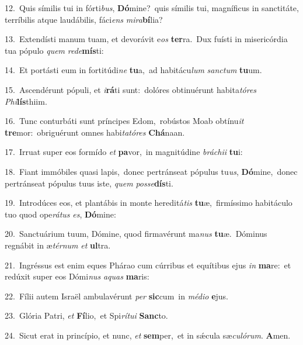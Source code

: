 {\numbfont\textcolor{\numbcolor}{12.}}~Quis símilis tui in fórti\-\textit{bus}\-, \textbf{Dó}\-mine?~\star quis símilis tui, magníficus in sanctitáte, terríbilis atque laudábilis, fáci\textit{ens} \textit{mi}\-\textit{ra}\textbf{bí}lia?\par
{\numbfont\textcolor{\numbcolor}{13.}}~Extendísti manum tuam, et devorávit e\textit{os} \textbf{ter}\-ra.~\star Dux fuísti in misericórdia tua pópulo \textit{quem} \textit{red}\-\textit{e}\textbf{mís}ti:\par
{\numbfont\textcolor{\numbcolor}{14.}}~Et portásti eum in fortitúdi\textit{ne} \textbf{tu}\-a,~\star ad habitácu\textit{lum} \textit{sanc}\-\textit{tum} \textbf{tu}\-um.\par
{\numbfont\textcolor{\numbcolor}{15.}}~Ascendérunt pópuli, et \textit{i}\-\textbf{rá}ti sunt:~\star dolóres obtinuérunt habita\-\textit{tó}\-\textit{res} \textit{Phi}\-\textbf{lís}thiim.\par
{\numbfont\textcolor{\numbcolor}{16.}}~Tunc conturbáti sunt príncipes Edom,~\dagger robústos Moab obtínu\textit{it} \textbf{tre}\-mor:~\star obriguérunt omnes habi\-\textit{ta}\-\textit{tó}\textit{res} \textbf{Chá}\-naan.\par
{\numbfont\textcolor{\numbcolor}{17.}}~Irruat super eos formído \textit{et} \textbf{pa}\-vor,~\star in magnitúdine \textit{brá}\-\textit{chi}\textit{i} \textbf{tu}\-i:\par
{\numbfont\textcolor{\numbcolor}{18.}}~Fiant immóbiles quasi lapis,~\dagger donec pertránseat pópulus tu\-\textit{us}\-, \textbf{Dó}\-mine,~\star donec pertránseat pópulus tuus iste, \textit{quem} \textit{pos}\-\textit{se}\textbf{dís}ti.\par
{\numbfont\textcolor{\numbcolor}{19.}}~Introdúces eos, et plantábis in monte hereditá\textit{tis} \textbf{tu}\-æ,~\star firmíssimo habitáculo tuo quod ope\-\textit{rá}\-\textit{tus} \textit{es}\-, \textbf{Dó}\-mine:\par
{\numbfont\textcolor{\numbcolor}{20.}}~Sanctuárium tuum, Dómine, quod firmavérunt ma\textit{nus} \textbf{tu}\-æ.~\star Dóminus regnábit in æ\-\textit{tér}\-\textit{num} \textit{et} \textbf{ul}\-tra.\par
{\numbfont\textcolor{\numbcolor}{21.}}~Ingréssus est enim eques Phárao cum cúrribus et equítibus ejus \textit{in} \textbf{ma}\-re:~\star et redúxit super eos Dómi\textit{nus} \textit{a}\-\textit{quas} \textbf{ma}\-ris:\par
{\numbfont\textcolor{\numbcolor}{22.}}~Fílii autem Israël ambulavérunt \textit{per} \textbf{sic}\-cum~\star in \textit{mé}\-\textit{di}\textit{o} \textbf{e}\-jus.\par
{\numbfont\textcolor{\numbcolor}{23.}}~Glória Patri, \textit{et} \textbf{Fí}\-lio,~\star et Spi\-\textit{rí}\-\textit{tu}\textit{i} \textbf{Sanc}\-to.\par
{\numbfont\textcolor{\numbcolor}{24.}}~Sicut erat in princípio, et nunc, \textit{et} \textbf{sem}\-per,~\star et in sǽcula sæ\-\textit{cu}\-\textit{ló}\textit{rum}. \textbf{A}\-men.\par
